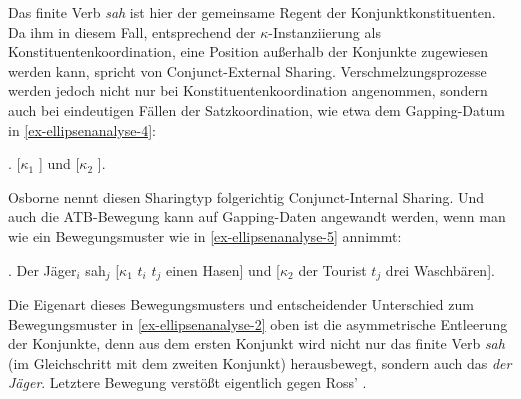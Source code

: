 Das finite Verb {\it sah} ist hier der gemeinsame Regent der Konjunktkonstituenten. Da ihm in diesem Fall, entsprechend der $\kappa$-Instanziierung als Konstituentenkoordination, eine Position au\ss erhalb der Konjunkte zugewiesen werden kann, spricht \cite{Osborne:08} von Conjunct-External Sharing. Verschmelzungsprozesse werden jedoch nicht nur bei Konstituentenkoordination angenommen, sondern auch  bei eindeutigen Fällen der Satzkoordination, wie etwa dem Gapping-Datum in \ref{ex-ellipsenanalyse-4}:  

\vspace{5ex}

\ex.\label{ex-ellipsenanalyse-4} [$\kappa_1$   ] und [$\kappa_2$  ].

Osborne nennt diesen Sharingtyp folgerichtig Conjunct-Internal Sharing. Und auch die ATB-Bewegung kann auf Gapping-Daten angewandt werden, wenn man wie \cite{Johnson:04,Johnson:09} ein Bewegungsmuster wie in \ref{ex-ellipsenanalyse-5} annimmt:

\ex. \label{ex-ellipsenanalyse-5} Der Jäger$_i$ sah$_j$ [$\kappa_1$ $t_i$ $t_j$ einen Hasen] und [$\kappa_2$ der Tourist $t_j$ drei Waschbären].

Die Eigenart dieses Bewegungsmusters und entscheidender Unterschied zum Bewegungsmuster in \ref{ex-ellipsenanalyse-2} oben ist die asymmetrische Entleerung der Konjunkte, denn aus dem ersten Konjunkt wird nicht nur das finite Verb {\it sah} (im Gleichschritt mit dem zweiten Konjunkt) herausbewegt, sondern auch das  {\it der Jäger}. Letztere Bewegung verstö\ss t eigentlich gegen Ross'  \citep[161]{Ross:67}. 

